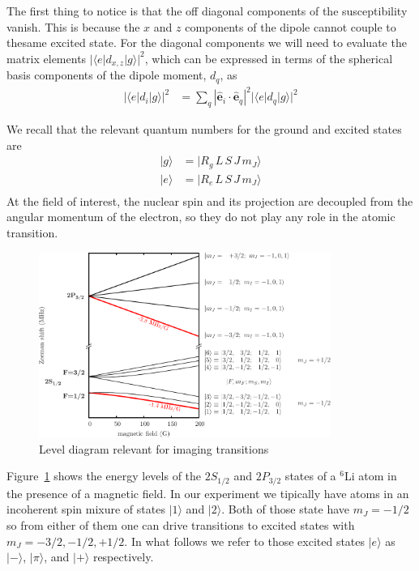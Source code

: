 \documentclass[11pt,letter]{article}
\newcommand{\bv}[1]{\ensuremath{\bm{#1}}}
\begin{document}
The first thing to notice is that the off diagonal components of the
susceptibility vanish.  This is because the $x$ and $z$ components of the
dipole cannot couple to thesame excited state.   For the diagonal components we
will need to evaluate the matrix elements $ | \langle e | d_{x,z} | g \rangle
|^{2} $,  which can be expressed in terms of the spherical basis components of
the dipole moment, $d_{q}$, as 
\begin{align}
|\langle e | d_{i} | g \rangle|^{2} & =  \sum_{q} |\bv{\hat{e}}_{i}\cdot \bv{\hat{e}}_{q}|^{2} 
 | \langle e | d_{q} | g \rangle | ^{2} 
\end{align}

We recall that the relevant quantum numbers for the ground and excited states are
\begin{align}
|g\rangle & = | R_{g}\, L\,S\,J\,m_{J} \rangle \\
|e\rangle & = | R_{e}\, L\,S\,J\,m_{J} \rangle \\
\end{align}
At the field of interest, the nuclear spin and its projection are decoupled
from the angular momentum of the electron,  so they do not play any role in the
atomic transition.
\begin{figure}[h]
\centering \includegraphics[width=0.85\textwidth]{01eps.pdf}
\caption[Levels relevant for imaging.]{Level diagram relevant for imaging transitions}  \label{fig:levels}
\end{figure}
Figure~\ref{fig:levels} shows the energy levels of the $2S_{1/2}$ and
$2P_{3/2}$ states of a $^{6}$Li atom in the presence of a magnetic field. In
our experiment we tipically have atoms in an incoherent spin mixure of states
$|1\rangle$ and $|2\rangle$.  Both of those state have $m_{J}=-1/2$ so from
either of them one can drive transitions to excited states with $m_{J}=-3/2,
-1/2, +1/2$.  In what follows we refer to those excited states $|e\rangle$ as
$|-\rangle$, $|\pi\rangle$, and $|+\rangle$ respectively. 
\end{document}
